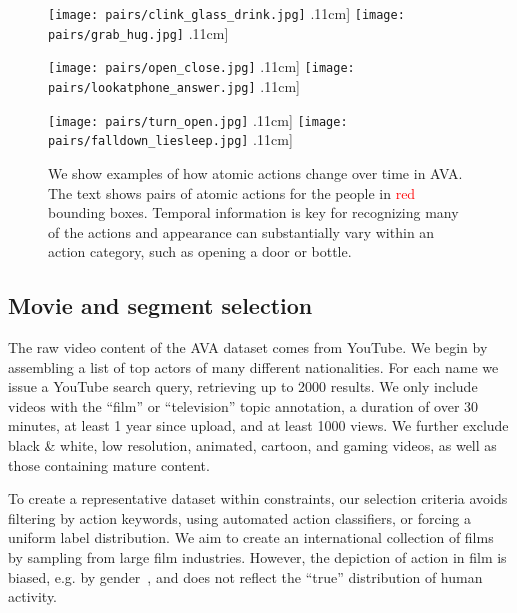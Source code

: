 \documentclass[10pt,twocolumn,letterpaper]{article}
\begin{document}
\begin{figure*}[tb!]
    \centering
    \small
\begin{minipage}{0.32\linewidth}\centering\texttt{[image: pairs/clink\_glass\_drink.jpg]} \0.11cm]
\texttt{[image: pairs/grab\_hug.jpg]} \0.11cm]\end{minipage}\hfill\begin{minipage}{0.32\linewidth}\centering
\texttt{[image: pairs/open\_close.jpg]} \0.11cm]
\texttt{[image: pairs/lookatphone\_answer.jpg]} \0.11cm]\end{minipage}\hfill\begin{minipage}{0.32\linewidth}\centering
\texttt{[image: pairs/turn\_open.jpg]} \0.11cm]
\texttt{[image: pairs/falldown\_liesleep.jpg]} \0.11cm]
\end{minipage}
\caption{We show examples of how atomic actions change over time in AVA. The text shows pairs of atomic actions for the people in \textcolor{red}{red} bounding boxes. Temporal information is key for recognizing many of the actions and appearance can substantially vary within an action category, such as opening a door or bottle.}\label{fig:example_annotations}
\vspace{-1em}
\end{figure*}

\subsection{Movie and segment selection}

The raw video content of the AVA dataset comes from YouTube. We begin by assembling a list of top actors of many different nationalities. For each name we issue a YouTube search query, retrieving up to 2000 results. We only include videos with the ``film'' or ``television'' topic annotation, a duration of over 30 minutes, at least 1 year since upload, and at least 1000 views. We further exclude black \& white, low resolution, animated, cartoon, and gaming videos, as well as those containing mature content.

To create a representative dataset within constraints, our selection criteria avoids filtering by action keywords, using automated action classifiers, or forcing a uniform label distribution. We aim to create an international collection of films by sampling from large film industries. However, the depiction of action in film is biased, e.g. by gender~\cite{geena_davis_2016}, and does not reflect the ``true'' distribution of human activity. 
\end{document}
